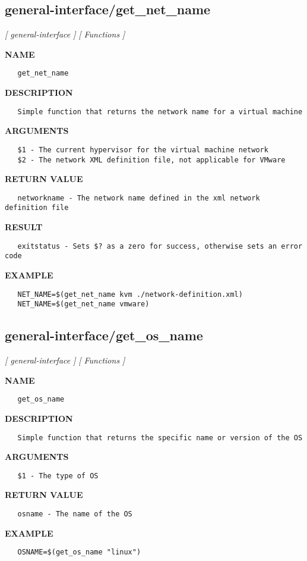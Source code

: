 \subsection{general-interface/get\_net\_name}
\textsl{[ general-interface ]}
\textsl{[ Functions ]}

\label{ch:robo28}
\label{ch:general_interface_get_net_name}
\textbf{NAME}
\begin{verbatim}
   get_net_name
\end{verbatim}
\textbf{DESCRIPTION}
\begin{verbatim}
   Simple function that returns the network name for a virtual machine
\end{verbatim}
\textbf{ARGUMENTS}
\begin{verbatim}
   $1 - The current hypervisor for the virtual machine network
   $2 - The network XML definition file, not applicable for VMware
\end{verbatim}
\textbf{RETURN VALUE}
\begin{verbatim}
   networkname - The network name defined in the xml network definition file
\end{verbatim}
\textbf{RESULT}
\begin{verbatim}
   exitstatus - Sets $? as a zero for success, otherwise sets an error code
\end{verbatim}
\textbf{EXAMPLE}
\begin{verbatim}
   NET_NAME=$(get_net_name kvm ./network-definition.xml)
   NET_NAME=$(get_net_name vmware)
\end{verbatim}
\newpage
\subsection{general-interface/get\_os\_name}
\textsl{[ general-interface ]}
\textsl{[ Functions ]}

\label{ch:robo29}
\label{ch:general_interface_get_os_name}
\textbf{NAME}
\begin{verbatim}
   get_os_name
\end{verbatim}
\textbf{DESCRIPTION}
\begin{verbatim}
   Simple function that returns the specific name or version of the OS
\end{verbatim}
\textbf{ARGUMENTS}
\begin{verbatim}
   $1 - The type of OS
\end{verbatim}
\textbf{RETURN VALUE}
\begin{verbatim}
   osname - The name of the OS
\end{verbatim}
\textbf{EXAMPLE}
\begin{verbatim}
   OSNAME=$(get_os_name "linux")
\end{verbatim}
\newpage
